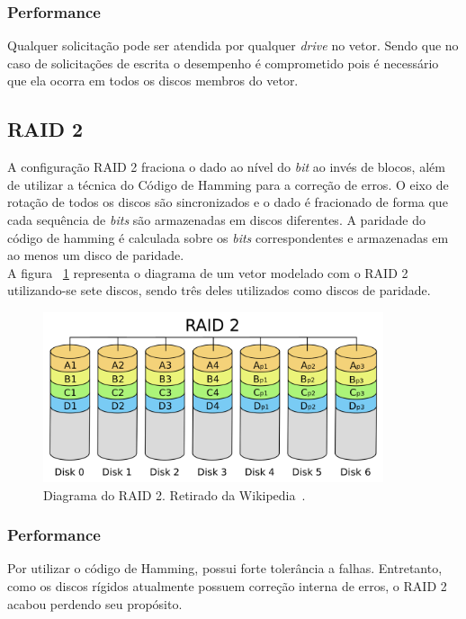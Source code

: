 		\subsubsection{Performance}
		
		Qualquer solicitação pode ser atendida por qualquer \textit{drive} no vetor. Sendo que no caso de solicitações de escrita o desempenho é comprometido pois é necessário que ela ocorra em todos os discos membros do vetor. \\
		
		\subsection{RAID 2}
		
		A configuração RAID 2 fraciona o dado ao nível do \textit{bit} ao invés de blocos, além de utilizar a técnica do Código de Hamming para a correção de erros. O eixo de rotação de todos os discos são sincronizados e o dado é fracionado de forma que cada sequência de \textit{bits} são armazenadas em discos diferentes. A paridade do código de hamming é calculada sobre os \textit{bits} correspondentes e armazenadas em ao menos um disco de paridade.\\
		
		A figura ~\ref{fig:raid2} representa o diagrama de um vetor modelado com o RAID 2 utilizando-se sete discos, sendo três deles utilizados como discos de paridade.\\
		
		\begin{figure}[htb]
			\begin{center}
				
				\includegraphics[clip,width=10.0cm]{images/RAID_2.png}
				\caption{Diagrama do RAID 2. Retirado da Wikipedia~\citep{wikiRAIDlevels}.}
				\label{fig:raid2}
			\end{center}
		\end{figure} 
		
		\subsubsection{Performance}
		Por utilizar o código de Hamming, possui forte tolerância a falhas. Entretanto, como os discos rígidos atualmente possuem correção interna de erros, o RAID 2 acabou perdendo seu propósito. 
	
